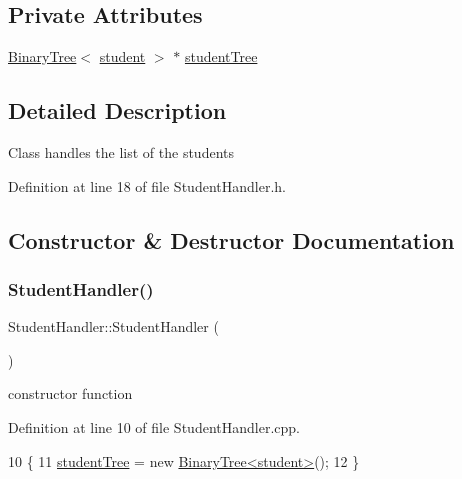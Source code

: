 \subsection*{Private Attributes}
\begin{DoxyCompactItemize}
\item 
\hyperlink{class_binary_tree}{Binary\+Tree}$<$ \hyperlink{classstudent}{student} $>$ $\ast$ \hyperlink{class_student_handler_a7141eccd57a30aa140e5b4e92b0939ea}{student\+Tree}
\end{DoxyCompactItemize}


\subsection{Detailed Description}
Class handles the list of the students 

Definition at line 18 of file Student\+Handler.\+h.



\subsection{Constructor \& Destructor Documentation}
\mbox{\label{class_student_handler_a789f9be791a4ada717975e9361f5c967}} 
\subsubsection{\texorpdfstring{Student\+Handler()}{StudentHandler()}}
{\footnotesize\ttfamily Student\+Handler\+::\+Student\+Handler (\begin{DoxyParamCaption}{ }\end{DoxyParamCaption})}

constructor function 

Definition at line 10 of file Student\+Handler.\+cpp.


\begin{DoxyCode}
10                                \{
11     \hyperlink{class_student_handler_a7141eccd57a30aa140e5b4e92b0939ea}{studentTree} = \textcolor{keyword}{new} \hyperlink{class_binary_tree}{BinaryTree<student>}();
12 \}
\end{DoxyCode}
\mbox{\label{class_student_handler_a1ad6892062e41ea9d5ac1ddf5cdf64c2}} 
